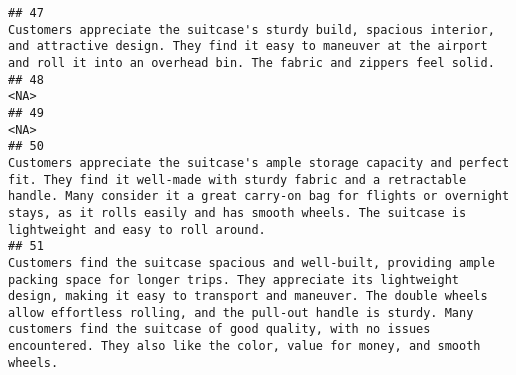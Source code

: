 \documentclass[
]{article}
\begin{document}
\begin{verbatim}
## 47                                                                                                                                                                                                                                                                                                                                                                                                              Customers appreciate the suitcase's sturdy build, spacious interior, and attractive design. They find it easy to maneuver at the airport and roll it into an overhead bin. The fabric and zippers feel solid.
## 48                                                                                                                                                                                                                                                                                                                                                                                                                                                                                                                                                                                                                       <NA>
## 49                                                                                                                                                                                                                                                                                                                                                                                                                                                                                                                                                                                                                       <NA>
## 50                                                                                                                                                                                                                                                                                                       Customers appreciate the suitcase's ample storage capacity and perfect fit. They find it well-made with sturdy fabric and a retractable handle. Many consider it a great carry-on bag for flights or overnight stays, as it rolls easily and has smooth wheels. The suitcase is lightweight and easy to roll around.
## 51                                                                                                                                                                                                          Customers find the suitcase spacious and well-built, providing ample packing space for longer trips. They appreciate its lightweight design, making it easy to transport and maneuver. The double wheels allow effortless rolling, and the pull-out handle is sturdy. Many customers find the suitcase of good quality, with no issues encountered. They also like the color, value for money, and smooth wheels.

\end{verbatim}
\end{document}
